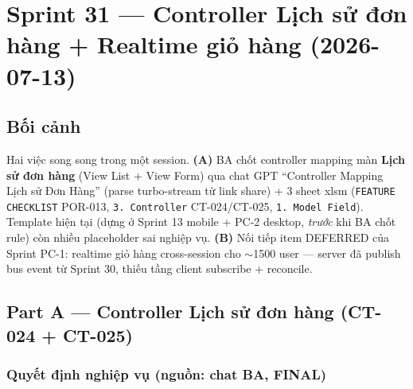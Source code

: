 \chapter{Sprint 31 --- Controller Lịch sử đơn hàng + Realtime giỏ hàng (2026-07-13)}

\section{Bối cảnh}

Hai việc song song trong một session. \textbf{(A)} BA chốt controller mapping màn
\textbf{Lịch sử đơn hàng} (View List + View Form) qua chat GPT ``Controller Mapping Lịch sử
Đơn Hàng'' (parse turbo-stream từ link share) + 3 sheet xlsm (\texttt{FEATURE CHECKLIST}
POR-013, \texttt{3. Controller} CT-024/CT-025, \texttt{1. Model Field}). Template hiện tại
(dựng ở Sprint 13 mobile + PC-2 desktop, \emph{trước} khi BA chốt rule) còn nhiều placeholder
sai nghiệp vụ. \textbf{(B)} Nối tiếp item DEFERRED của Sprint PC-1: realtime giỏ hàng
cross-session cho $\sim$1500 user --- server đã publish bus event từ Sprint 30, thiếu tầng
client subscribe + reconcile.

\section{Part A --- Controller Lịch sử đơn hàng (CT-024 + CT-025)}

\subsection{Quyết định nghiệp vụ (nguồn: chat BA, FINAL)}

